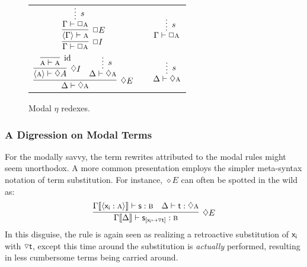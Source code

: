 \begin{figure}
	\centering
		\begin{tabularx}{0.8\textwidth}{@{}ccc@{}}
			$\infer[\Box I]{\Gamma \vdash \Box\prop{A}}{
			\infer[\Box E]{\bracket{\Gamma} \vdash \prop{A}}{
					\infer*[s]{\Gamma \vdash  \Box\prop{A}}{}
				}
			}
			$
			&
			\raisebox{5pt}{$\equiv$}
			&
			$\infer*[s]{\Gamma \vdash \Box\prop{A}}{}
			$\\[\smallsep]
			$\infer[\diamond E]{\Delta \vdash \diamond\prop{A}}{
				\infer[\diamond I]{\bracket{\prop{A}}\vdash \diamond A}{
					\infer[\Ax]{\prop{A} \vdash \prop{A}}{}
				}
				&
				\infer*[s]{\Delta \vdash \diamond\prop{A}}{}
			}$
			&
			\raisebox{15pt}{$\equiv$}
			&
			$\infer*[s]{\Delta \vdash \diamond \prop{A}}{}
			$
		\end{tabularx}
	\caption{Modal $\eta$ redexes.}
	\label{figure:modal_eta_reductions}
\end{figure}


\subsubsection{A Digression on Modal Terms}
For the modally savvy, the term rewrites attributed to the modal rules might seem unorthodox.
A more common presentation employs the simpler meta-syntax notation of term substitution.
For instance, $\diamond E$ can often be spotted in the wild as:
\[
	\infer[\diamond E]{\Gamma\ctx{\Delta} \vdash \term{s}_{[\term{x_i }\mapsto\term{\diaelim t}]}: \prop{B}}{
		\Gamma\ctx{\bracket{\term{x_i }:\prop{A}}}\vdash\term{s}:\prop{B}
		&
		\Delta \vdash \term{t}:\diamond\prop{A}
	}
\]
In this disguise, the rule is again seen as realizing a retroactive substitution of $\mathsf{x_i }$ with $\smallterm{\diaelim t}$, except this time around the substitution is \textit{actually} performed, resulting in less cumbersome terms being carried around.

